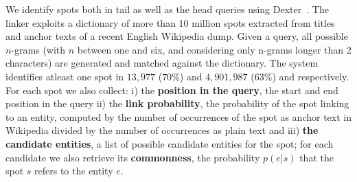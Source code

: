 We identify spots both in tail as well as the head queries %
using Dexter~\cite{ceccarelli2013dexter}. The linker exploits a dictionary of more than 10 million spots extracted from titles and anchor texts of a recent English Wikipedia dump. Given a query, all possible $n$-grams (with $n$ between one and six, and considering only n-grams longer than 2 characters) are generated and matched against the dictionary. The system identifies atleast one spot in $13,977$ ($70\%$) and $4,901,987$ ($63\%$) \head{} and \tail{} respectively. For each spot we also collect: 
i) the \textbf{position in the query}, the start and end position in the query ii) the \textbf{link probability}, the probability
of the spot linking to an entity, computed by the number of occurrences of the spot as anchor text in Wikipedia divided by the number of occurrences as plain text and iii) \textbf{the candidate entities}, a list of possible candidate entities for the spot; for each candidate we also retrieve its \textbf{commonness}, the probability $p(e|s)$ that the spot $s$ refers to the entity $e$.

